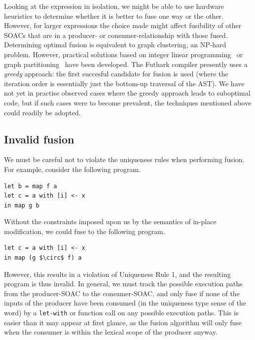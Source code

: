 Looking at the expression in isolation, we might be able to use
hardware heuristics to determine whether it is better to fuse one way
or the other.  However, for larger expressions the choice made might
affect fusibility of other SOACs that are in a producer- or
consumer-relationship with those fused.  Determining optimal fusion is
equivalent to graph clustering, an NP-hard problem.  However,
practical solutions based on integer linear
programming~\cite{Megiddo:1997:OWL:258492.258520} or graph
partitioning~\cite{Kristensen:2016:FPA:2967938.2967945} have been
developed.  The Futhark compiler presently uses a \textit{greedy}
approach: the first succesful candidate for fusion is used (where the
iteration order is essentially just the bottom-up traversal of the
AST).  We have not yet in practise observed cases where the greedy
approach leads to suboptimal code, but if such cases were to become
prevalent, the techniques mentioned above could readily be adopted.

\subsection{Invalid fusion}
\label{sec:invalidfusion}

We must be careful not to violate the uniqueness rules when performing
fusion.  For example, consider the following program.
\begin{lstlisting}
let b = map f a
let c = a with [i] <- x
in map g b
\end{lstlisting}
Without the constraints imposed upon us by the semantics of in-place
modification, we could fuse to the following program.
\begin{lstlisting}[mathescape]
let c = a with [i] <- x
in map (g $\circ$ f) a
\end{lstlisting}
However, this results in a violation of Uniqueness Rule 1, and the
resulting program is thus invalid.  In general, we must track the
possible execution paths from the producer-SOAC to the consumer-SOAC,
and only fuse if none of the inputs of the producer have been consumed
(in the uniqueness type sense of the word) by a \lstinline{let-with} or
function call on any possible execution paths.  This is easier than it
may appear at first glance, as the fusion algorithm will only fuse
when the consumer is within the lexical scope of the producer anyway.

